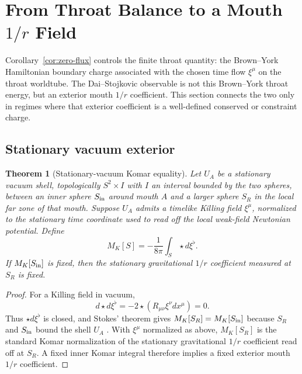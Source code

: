 \documentclass[aps,prd,10pt,onecolumn,nofootinbib,superscriptaddress,floatfix]{revtex4-2}
\newtheorem{theorem}{Theorem}
\begin{document}
\section{From Throat Balance to a Mouth \texorpdfstring{$1/r$}{1/r} Field}
\label{sec:mouth-bridge}

Corollary~\ref{cor:zero-flux} controls the finite throat quantity: the
Brown--York Hamiltonian boundary charge associated with the chosen time flow
$\xi^\mu$ on the throat worldtube.  The Dai--Stojkovic observable is not this
Brown--York throat energy, but an exterior mouth $1/r$ coefficient.  This
section connects the two only in regimes where that exterior coefficient is a
well-defined conserved or constraint charge.

\subsection{Stationary vacuum exterior}

\begin{theorem}[Stationary-vacuum Komar equality]
\label{thm:komar-propagation}
Let $U_A$ be a stationary vacuum shell, topologically $S^2\times I$ with $I$
an interval bounded by the two spheres, between an inner sphere $S_{\rm in}$
around mouth $A$ and a larger sphere $S_R$ in the local far zone of that
mouth.  Suppose $U_A$ admits a timelike Killing field
$\xi^\mu$, normalized to the stationary time coordinate used to read off the
local weak-field Newtonian potential.  Define
\begin{equation}
  M_K[S]=-\frac{1}{8\pi}\int_S\star d\xi^\flat .
\end{equation}
If $M_K[S_{\rm in}]$ is fixed, then the stationary gravitational $1/r$
coefficient measured at $S_R$ is fixed.
\end{theorem}

\begin{proof}
For a Killing field in vacuum,
\begin{equation}
  d\star d\xi^\flat=-2\star(R_{\mu\nu}\xi^\nu dx^\mu)=0 .
\end{equation}
Thus $\star d\xi^\flat$ is closed, and Stokes' theorem gives
$M_K[S_R]=M_K[S_{\rm in}]$ because $S_R$ and $S_{\rm in}$ bound the shell $U_A$
\cite{Komar1959Covariant}.  With $\xi^\mu$ normalized as above, $M_K[S_R]$ is
the standard Komar normalization of the stationary gravitational $1/r$
coefficient read off at $S_R$.  A fixed inner Komar integral therefore implies
a fixed exterior mouth $1/r$ coefficient.
\end{proof}
\end{document}
